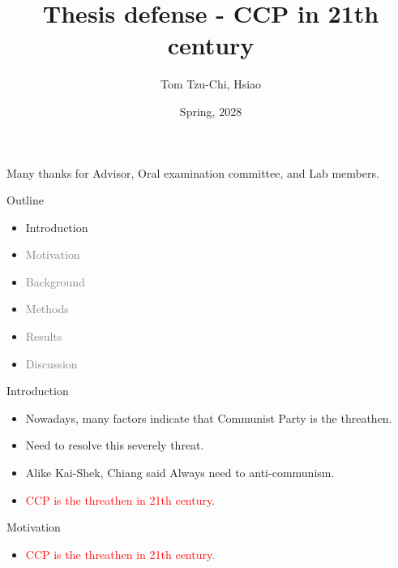 \documentclass[fleqn]{beamer}
\title{Thesis defense - CCP in 21th century}
\author{Tom Tzu-Chi, Hsiao}
\date{Spring, 2028}
\begin{document}
\begin{frame}
\titlepage
\begin{center}
Many thanks for Advisor, Oral examination committee, and Lab members.
\end{center}
\end{frame}
\begin{frame}{Outline}
\begin{itemize}
\item Introduction
\item \textcolor{gray}{Motivation}
\item \textcolor{gray}{Background}
\item \textcolor{gray}{Methods}
\item \textcolor{gray}{Results}
\item \textcolor{gray}{Discussion}
\end{itemize}
\end{frame}
\begin{frame}{Introduction}
\begin{itemize}
\item Nowadays, many factors indicate that Communist Party is the threathen.
\item Need to resolve this severely threat.
\item Alike Kai-Shek, Chiang said Always need to anti-communism.
\item \textcolor{red}{CCP is the threathen in 21th century.}
\end{itemize}
\end{frame}
\begin{frame}{Motivation}
\begin{itemize}
\item \textcolor{red}{CCP is the threathen in 21th century.}
\end{itemize}
\end{frame}
\end{document}
